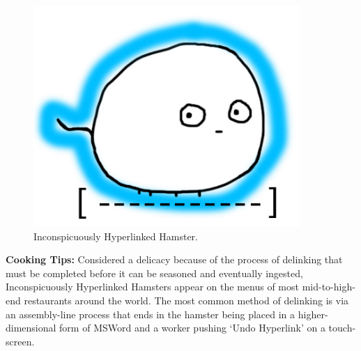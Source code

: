 \documentclass[10pt,twoside,openright]{memoir}
\begin{document}
\begin{figure}[t!]                                                              
\begin{center}                                                                  
\includegraphics[width=0.9\textwidth]{img/hyperlinked}                         
\end{center}                                                                    
\caption*{Inconspicuously Hyperlinked Hamster.}                                               
\end{figure}

\noindent
\textbf{Cooking Tips:} Considered a delicacy because of the process of 
delinking that
must be completed before it can be seasoned and eventually ingested,
Inconspicuously Hyperlinked Hamsters appear on the menus of most mid-to-high-end
restaurants around the world. The most common method of delinking is via an
assembly-line process that ends in the hamster being placed in a
higher-dimensional form of MSWord and a worker pushing `Undo Hyperlink'
on a touch-screen.
\end{document}
